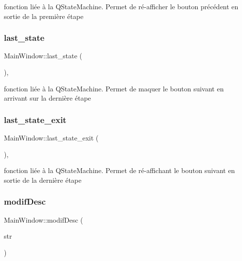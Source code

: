 fonction liée à la Q\+State\+Machine. Permet de ré-\/afficher le bouton précédent en sortie de la première étape 

\mbox{\label{classMainWindow_af3f49b394ed51e824ae8fc81d1ef252e}} 
\subsubsection{\texorpdfstring{last\+\_\+state}{last\_state}}
{\footnotesize\ttfamily Main\+Window\+::last\+\_\+state (\begin{DoxyParamCaption}{ }\end{DoxyParamCaption})\hspace{0.3cm}{\ttfamily [private]}, {\ttfamily [slot]}}



fonction liée à la Q\+State\+Machine. Permet de maquer le bouton suivant en arrivant sur la dernière étape 

\mbox{\label{classMainWindow_a519a0a9fd60eea17c887433feab17ce0}} 
\subsubsection{\texorpdfstring{last\+\_\+state\+\_\+exit}{last\_state\_exit}}
{\footnotesize\ttfamily Main\+Window\+::last\+\_\+state\+\_\+exit (\begin{DoxyParamCaption}{ }\end{DoxyParamCaption})\hspace{0.3cm}{\ttfamily [private]}, {\ttfamily [slot]}}



fonction liée à la Q\+State\+Machine. Permet de ré-\/affichant le bouton suivant en sortie de la dernière étape 

\mbox{\label{classMainWindow_a77ada7a541d869ea7f3647900ba6f6df}} 
\subsubsection{\texorpdfstring{modif\+Desc}{modifDesc}}
{\footnotesize\ttfamily Main\+Window\+::modif\+Desc (\begin{DoxyParamCaption}\item[{Q\+String}]{str }\end{DoxyParamCaption})\hspace{0.3cm}{\ttfamily [slot]}}



